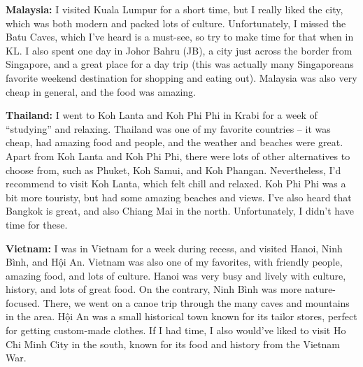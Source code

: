 \textbf{Malaysia:} I visited Kuala Lumpur for a short time, but I really liked the city, which was both modern and packed lots of culture. Unfortunately, I missed the Batu Caves, which I've heard is a must-see, so try to make time for that when in KL. I also spent one day in Johor Bahru (JB), a city just across the border from Singapore, and a great place for a day trip (this was actually many Singaporeans favorite weekend destination for shopping and eating out). Malaysia was also very cheap in general, and the food was amazing.

\textbf{Thailand:} I went to Koh Lanta and Koh Phi Phi in Krabi for a week of ``studying'' and relaxing. Thailand was one of my favorite countries -- it was cheap, had amazing food and people, and the weather and beaches were great. Apart from Koh Lanta and Koh Phi Phi, there were lots of other alternatives to choose from, such as Phuket, Koh Samui, and Koh Phangan. Nevertheless, I'd recommend to visit Koh Lanta, which felt chill and relaxed. Koh Phi Phi was a bit more touristy, but had some amazing beaches and views. I've also heard that Bangkok is great, and also Chiang Mai in the north. Unfortunately, I didn't have time for these.

\textbf{Vietnam:} I was in Vietnam for a week during recess, and visited Hanoi, Ninh Bình, and H\d{ô}i An. Vietnam was also one of my favorites, with friendly people, amazing food, and lots of culture. Hanoi was very busy and lively with culture, history, and lots of great food. On the contrary, Ninh Bình was more nature-focused. There, we went on a canoe trip through the many caves and mountains in the area. H\d{ô}i An was a small historical town known for its tailor stores, perfect for getting custom-made clothes. If I had time, I also would've liked to visit Ho Chi Minh City in the south, known for its food and history from the Vietnam War.


